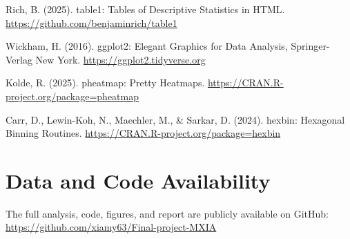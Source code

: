 \documentclass{article}
\begin{document}
\begin{thebibliography}{9}
Rich, B. (2025). table1: Tables of Descriptive Statistics in HTML.
\url{https://github.com/benjaminrich/table1}

Wickham, H. (2016). ggplot2: Elegant Graphics for Data Analysis, Springer-Verlag New York.
\url{https://ggplot2.tidyverse.org}

Kolde, R. (2025). pheatmap: Pretty Heatmaps.
\url{https://CRAN.R-project.org/package=pheatmap}

Carr, D., Lewin-Koh, N., Maechler, M., \& Sarkar, D. (2024). hexbin: Hexagonal Binning Routines.
\url {https://CRAN.R-project.org/package=hexbin}
\end{thebibliography}


\section*{Data and Code Availability}

The full analysis, code, figures, and report are publicly available on GitHub: \url{https://github.com/xiamy63/Final-project-MXIA}
\end{document}
